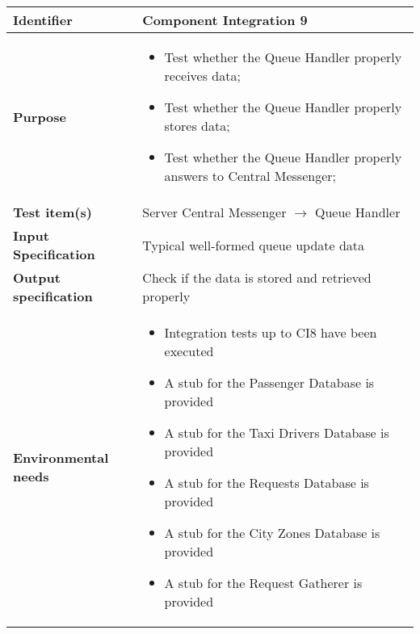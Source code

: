 \begin{center}
\begin{tabular}{lp{}}
\toprule
\textbf{Identifier}		&	Component Integration 9\\
\midrule
\textbf{Purpose}		&	\begin{itemize}
					\item Test whether the Queue Handler properly receives data;
					\item Test whether the Queue Handler properly stores data; 
					\item Test whether the Queue Handler properly answers to Central Messenger;
					\end{itemize}	\\
\textbf{Test item(s)}	&	Server Central Messenger $\rightarrow$ Queue Handler\\
\textbf{Input Specification}	&	Typical well-formed queue update data\\
\textbf{Output specification}	&	Check if the data is stored and retrieved properly\\
\textbf{Environmental needs}	&	\begin{itemize}
							\item Integration tests up to CI8 have been executed
							\item A stub for the Passenger Database is provided
							\item A stub for the Taxi Drivers Database is provided
							\item A stub for the Requests Database is provided
							\item A stub for the City Zones Database is provided
							\item A stub for the Request Gatherer is provided
							\end{itemize}	\\
\bottomrule
\end{tabular}
\end{center}




